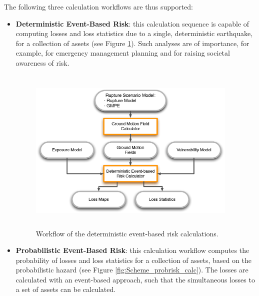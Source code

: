 The following three calculation workflows are thus supported:
\begin{itemize}
\item \textbf{Deterministic Event-Based Risk}: this calculation sequence is capable of computing losses and loss statistics due to a single,
deterministic earthquake, for a collection of assets (see Figure \ref{fig:Scheme_detrisk_calc}). Such analyses are of importance, for example, for emergency management planning and for raising societal awareness of risk. 

\begin{figure}[ht]
\centering
\includegraphics[width=10cm,height=8cm]{./Figures/Part_Risk/Scheme_Deter_calc.eps}
\caption{Workflow of the deterministic event-based risk calculations.}
\label{fig:Scheme_detrisk_calc}
\end{figure}

\item \textbf{Probabilistic Event-Based Risk}: this calculation workflow computes the probability of losses and loss statistics for a collection of
assets, based on the probabilistic hazard (see Figure \ref{fig:Scheme_probrisk_calc}). The losses are calculated with an event-based approach, such that the simultaneous losses to a set of assets can be calculated.


\end{itemize}
